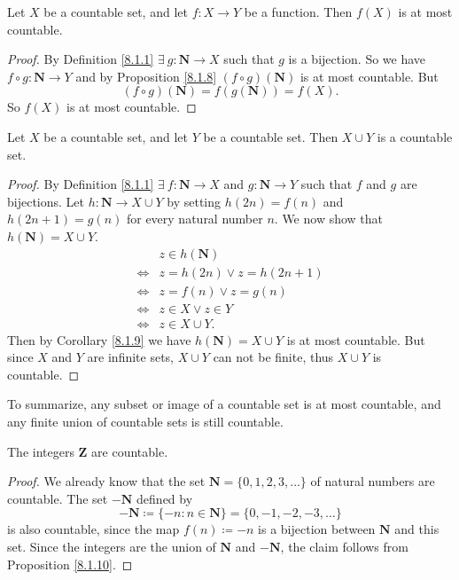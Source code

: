\begin{corollary}\label{8.1.9}
Let \(X\) be a countable set, and let \(f : X \to Y\) be a function.
Then \(f(X)\) is at most countable.
\end{corollary}

\begin{proof}
By Definition \ref{8.1.1} \(\exists\ g : \mathbf{N} \to X\) such that \(g\) is a bijection.
So we have \(f \circ g : \mathbf{N} \to Y\) and by Proposition \ref{8.1.8} \((f \circ g)(\mathbf{N})\) is at most countable.
But
\[
    (f \circ g)(\mathbf{N}) = f(g(\mathbf{N})) = f(X).
\]
So \(f(X)\) is at most countable.
\end{proof}

\begin{proposition}\label{8.1.10}
Let \(X\) be a countable set, and let \(Y\) be a countable set.
Then \(X \cup Y\) is a countable set.
\end{proposition}

\begin{proof}
By Definition \ref{8.1.1} \(\exists\ f : \mathbf{N} \to X\) and \(g : \mathbf{N} \to Y\) such that \(f\) and \(g\) are bijections.
Let \(h : \mathbf{N} \to X \cup Y\) by setting \(h(2n) = f(n)\) and \(h(2n + 1) = g(n)\) for every natural number \(n\).
We now show that \(h(\mathbf{N}) = X \cup Y\).
\begin{align*}
& z \in h(\mathbf{N}) \\
\iff & z = h(2n) \lor z = h(2n + 1) \\
\iff & z = f(n) \lor z = g(n) \\
\iff & z \in X \lor z \in Y \\
\iff & z \in X \cup Y.
\end{align*}
Then by Corollary \ref{8.1.9} we have \(h(\mathbf{N}) = X \cup Y\) is at most countable.
But since \(X\) and \(Y\) are infinite sets, \(X \cup Y\) can not be finite, thus \(X \cup Y\) is countable.
\end{proof}

\begin{note}
To summarize, any subset or image of a countable set is at most countable, and any finite union of countable sets is still countable.
\end{note}

\begin{corollary}\label{8.1.11}
The integers \(\mathbf{Z}\) are countable.
\end{corollary}

\begin{proof}
We already know that the set \(\mathbf{N} = \{0, 1, 2, 3, \dots\}\) of natural numbers are countable.
The set \(-\mathbf{N}\) defined by
\[
    -\mathbf{N} \coloneqq \{-n : n \in \mathbf{N}\} = \{0, -1, -2, -3, \dots\}
\]
is also countable, since the map \(f(n) \coloneqq -n\) is a bijection between \(\mathbf{N}\) and this set.
Since the integers are the union of \(\mathbf{N}\) and \(-\mathbf{N}\), the claim follows from Proposition \ref{8.1.10}.
\end{proof}

